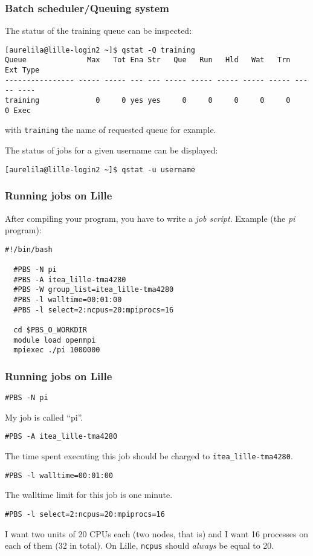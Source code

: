 \begin{frame}[fragile]
\frametitle{Batch scheduler/Queuing system}

The status of the training queue can be inspected:
{\tiny
\begin{lstlisting}[style=shell]
[aurelila@lille-login2 ~]$ qstat -Q training
Queue              Max   Tot Ena Str   Que   Run   Hld   Wat   Trn   Ext Type
---------------- ----- ----- --- --- ----- ----- ----- ----- ----- ----- ----
training             0     0 yes yes     0     0     0     0     0     0 Exec
\end{lstlisting}
}
with \texttt{training} the name of requested queue for example.

\medskip
The status of jobs for a given username can be displayed:
\begin{lstlisting}[style=shell]
[aurelila@lille-login2 ~]$ qstat -u username
\end{lstlisting}



\end{frame}

\begin{frame}[fragile]
  \frametitle{Running jobs on Lille}
  After compiling your program, you have to write a \emph{job script}. Example
  (the \emph{pi} program):
\begin{lstlisting}[style=shell]
  #!/bin/bash

  #PBS -N pi
  #PBS -A itea_lille-tma4280
  #PBS -W group_list=itea_lille-tma4280
  #PBS -l walltime=00:01:00
  #PBS -l select=2:ncpus=20:mpiprocs=16

  cd $PBS_O_WORKDIR
  module load openmpi
  mpiexec ./pi 1000000
\end{lstlisting}
\end{frame}

\begin{frame}[fragile]
  \frametitle{Running jobs on Lille}
\begin{lstlisting}[style=shell]
  #PBS -N pi
\end{lstlisting}
  My job is called ``pi''.
\begin{lstlisting}[style=shell]
  #PBS -A itea_lille-tma4280
\end{lstlisting}
  The time spent executing this job should be charged to \texttt{itea\_lille-tma4280}.
\begin{lstlisting}[style=shell]
  #PBS -l walltime=00:01:00
\end{lstlisting}
  The walltime limit for this job is one minute.
\begin{lstlisting}[style=shell]
  #PBS -l select=2:ncpus=20:mpiprocs=16
\end{lstlisting}
  I want two units of 20 CPUs each (two nodes, that is) and I want 16 processes
  on each of them (32 in total). On Lille, \texttt{ncpus} should \emph{always}
  be equal to 20.
\end{frame}

